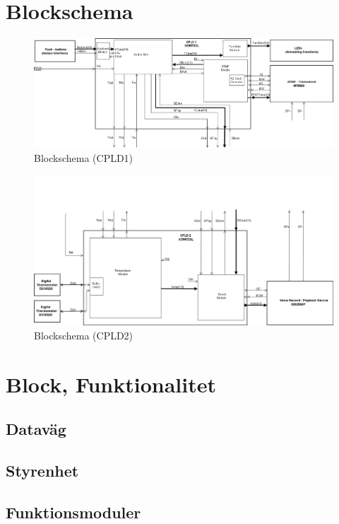\documentclass[a4paper,11pt]{article}
\begin{document}
\section{Blockschema}

	\begin{figure}[h!]
	  \centering
	      \includegraphics[scale=0.48, angle=90]{BlockDiagramCPLD1.png}
	  	\caption{Blockschema (CPLD1)}
	\end{figure}

	\begin{figure}[h!]
	  \centering
	      \includegraphics[scale=0.48, angle=90]{BlockDiagramCPLD2.png}
	  	\caption{Blockschema (CPLD2)}
	\end{figure}

\section{Block, Funktionalitet}

	\subsection{Dataväg}

	\subsection{Styrenhet}

	\subsection{Funktionsmoduler}
\end{document}
